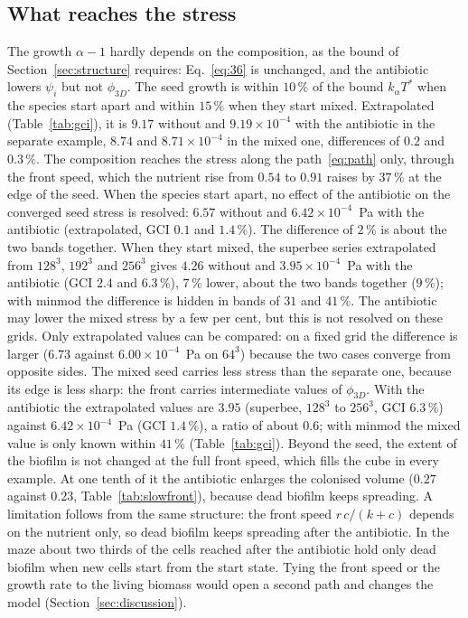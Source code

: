 \documentclass[11pt,a4paper]{article}
\newcommand{\phiD}{\phi_{3D}}
\begin{document}
\subsection{What reaches the stress}
\label{sec:stress}

The growth $\alpha-1$ hardly depends on the composition, as the bound of Section~\ref{sec:structure} requires: Eq.~\eqref{eq:36} is unchanged, and the antibiotic lowers $\psi_i$ but not $\phiD$. The seed growth is within $10\,\%$ of the bound $k_\alpha T^*$ when the species start apart and within $15\,\%$ when they start mixed. Extrapolated (Table~\ref{tab:gci}), it is $9.17$ without and $9.19\times10^{-4}$ with the antibiotic in the separate example, $8.74$ and $8.71\times10^{-4}$ in the mixed one, differences of $0.2$ and $0.3\,\%$. The composition reaches the stress along the path~\eqref{eq:path} only, through the front speed, which the nutrient rise from $0.54$ to $0.91$ raises by $37\,\%$ at the edge of the seed. When the species start apart, no effect of the antibiotic on the converged seed stress is resolved: $6.57$ without and $6.42\times10^{-4}$~Pa with the antibiotic (extrapolated, GCI $0.1$ and $1.4\,\%$). The difference of $2\,\%$ is about the two bands together. When they start mixed, the superbee series extrapolated from $128^3$, $192^3$ and $256^3$ gives $4.26$ without and $3.95\times10^{-4}$~Pa with the antibiotic (GCI $2.4$ and $6.3\,\%$), $7\,\%$ lower, about the two bands together ($9\,\%$); with minmod the difference is hidden in bands of $31$ and $41\,\%$. The antibiotic may lower the mixed stress by a few per cent, but this is not resolved on these grids. Only extrapolated values can be compared: on a fixed grid the difference is larger ($6.73$ against $6.00\times10^{-4}$~Pa on $64^3$) because the two cases converge from opposite sides. The mixed seed carries less stress than the separate one, because its edge is less sharp: the front carries intermediate values of $\phiD$. With the antibiotic the extrapolated values are $3.95$ (superbee, $128^3$ to $256^3$, GCI $6.3\,\%$) against $6.42\times10^{-4}$~Pa (GCI $1.4\,\%$), a ratio of about $0.6$; with minmod the mixed value is only known within $41\,\%$ (Table~\ref{tab:gci}). Beyond the seed, the extent of the biofilm is not changed at the full front speed, which fills the cube in every example. At one tenth of it the antibiotic enlarges the colonised volume ($0.27$ against $0.23$, Table~\ref{tab:slowfront}), because dead biofilm keeps spreading. A limitation follows from the same structure: the front speed $r\,c/(k+c)$ depends on the nutrient only, so dead biofilm keeps spreading after the antibiotic. In the maze about two thirds of the cells reached after the antibiotic hold only dead biofilm when new cells start from the start state. Tying the front speed or the growth rate to the living biomass would open a second path and changes the model (Section~\ref{sec:discussion}).
\end{document}
